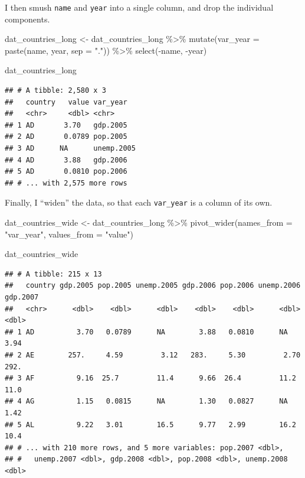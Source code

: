 \documentclass[
  12pt,
  oneside,openany]{book}
\newenvironment{Shaded}{\begin{snugshade}}{\end{snugshade}}
\newcommand{\AttributeTok}[1]{\textcolor[rgb]{0.77,0.63,0.00}{#1}}
\newcommand{\FunctionTok}[1]{\textcolor[rgb]{0.00,0.00,0.00}{#1}}
\newcommand{\NormalTok}[1]{#1}
\newcommand{\OtherTok}[1]{\textcolor[rgb]{0.56,0.35,0.01}{#1}}
\newcommand{\SpecialCharTok}[1]{\textcolor[rgb]{0.00,0.00,0.00}{#1}}
\newcommand{\StringTok}[1]{\textcolor[rgb]{0.31,0.60,0.02}{#1}}
\begin{document}
I then smush \texttt{name} and \texttt{year} into a single column, and drop the individual components.

\begin{Shaded}
\begin{Highlighting}[]
\NormalTok{dat\_countries\_long }\OtherTok{\textless{}{-}}\NormalTok{ dat\_countries\_long }\SpecialCharTok{\%\textgreater{}\%}
  \FunctionTok{mutate}\NormalTok{(}\AttributeTok{var\_year =} \FunctionTok{paste}\NormalTok{(name, year, }\AttributeTok{sep =} \StringTok{"."}\NormalTok{)) }\SpecialCharTok{\%\textgreater{}\%}
  \FunctionTok{select}\NormalTok{(}\SpecialCharTok{{-}}\NormalTok{name, }\SpecialCharTok{{-}}\NormalTok{year)}

\NormalTok{dat\_countries\_long}
\end{Highlighting}
\end{Shaded}

\begin{verbatim}
## # A tibble: 2,580 x 3
##   country   value var_year  
##   <chr>     <dbl> <chr>     
## 1 AD       3.70   gdp.2005  
## 2 AD       0.0789 pop.2005  
## 3 AD      NA      unemp.2005
## 4 AD       3.88   gdp.2006  
## 5 AD       0.0810 pop.2006  
## # ... with 2,575 more rows
\end{verbatim}

Finally, I ``widen'' the data, so that each \texttt{var\_year} is a column of its own.

\begin{Shaded}
\begin{Highlighting}[]
\NormalTok{dat\_countries\_wide }\OtherTok{\textless{}{-}}\NormalTok{ dat\_countries\_long }\SpecialCharTok{\%\textgreater{}\%}
  \FunctionTok{pivot\_wider}\NormalTok{(}\AttributeTok{names\_from =} \StringTok{"var\_year"}\NormalTok{, }\AttributeTok{values\_from =} \StringTok{"value"}\NormalTok{)}

\NormalTok{dat\_countries\_wide}
\end{Highlighting}
\end{Shaded}

\begin{verbatim}
## # A tibble: 215 x 13
##   country gdp.2005 pop.2005 unemp.2005 gdp.2006 pop.2006 unemp.2006 gdp.2007
##   <chr>      <dbl>    <dbl>      <dbl>    <dbl>    <dbl>      <dbl>    <dbl>
## 1 AD          3.70   0.0789      NA        3.88   0.0810      NA        3.94
## 2 AE        257.     4.59         3.12   283.     5.30         2.70   292.  
## 3 AF          9.16  25.7         11.4      9.66  26.4         11.2     11.0 
## 4 AG          1.15   0.0815      NA        1.30   0.0827      NA        1.42
## 5 AL          9.22   3.01        16.5      9.77   2.99        16.2     10.4 
## # ... with 210 more rows, and 5 more variables: pop.2007 <dbl>,
## #   unemp.2007 <dbl>, gdp.2008 <dbl>, pop.2008 <dbl>, unemp.2008 <dbl>
\end{verbatim}
\end{document}
